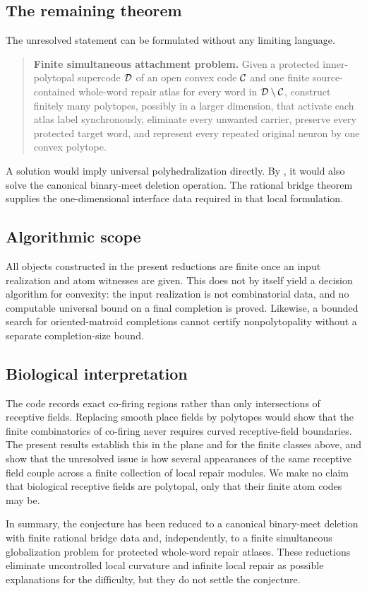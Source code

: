 \subsection{The remaining theorem}

The unresolved statement can be formulated without any limiting language.

\begin{quote}
\textbf{Finite simultaneous attachment problem.}
Given a protected inner-polytopal supercode $\mathcal D$ of an open convex code $\mathcal C$ and one finite source-contained whole-word repair atlas for every word in $\mathcal D\setminus\mathcal C$, construct finitely many polytopes, possibly in a larger dimension, that activate each atlas label synchronously, eliminate every unwanted carrier, preserve every protected target word, and represent every repeated original neuron by one convex polytope.
\end{quote}

A solution would imply universal polyhedralization directly.  By , it would also solve the canonical binary-meet deletion operation.  The rational bridge theorem supplies the one-dimensional interface data required in that local formulation.

\subsection{Algorithmic scope}

All objects constructed in the present reductions are finite once an input realization and atom witnesses are given.  This does not by itself yield a decision algorithm for convexity: the input realization is not combinatorial data, and no computable universal bound on a final completion is proved.  Likewise, a bounded search for oriented-matroid completions cannot certify nonpolytopality without a separate completion-size bound.

\subsection{Biological interpretation}

The code records exact co-firing regions rather than only intersections of receptive fields.  Replacing smooth place fields by polytopes would show that the finite combinatorics of co-firing never requires curved receptive-field boundaries.  The present results establish this in the plane and for the finite classes above, and show that the unresolved issue is how several appearances of the same receptive field couple across a finite collection of local repair modules.  We make no claim that biological receptive fields are polytopal, only that their finite atom codes may be.

In summary, the conjecture has been reduced to a canonical binary-meet deletion with finite rational bridge data and, independently, to a finite simultaneous globalization problem for protected whole-word repair atlases.  These reductions eliminate uncontrolled local curvature and infinite local repair as possible explanations for the difficulty, but they do not settle the conjecture.
